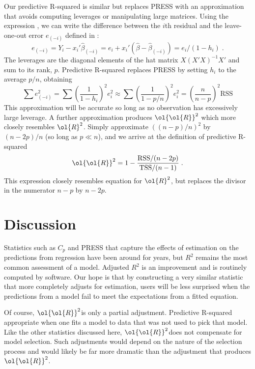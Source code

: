 \documentclass[12pt]{article}
\newcommand{\ars}{\mbox{$\ol{R}^2$}}
\newcommand{\prs}{\mbox{$\ol{\ol{R}}^2$}}
\begin{document}
Our predictive R-squared is similar but replaces PRESS with an approximation that avoids computing leverages or manipulating large matrices.  Using the expression , we can write the difference between the $i$th residual and the leave-one-out error $e_{(-i)}$ defined in :
\begin{equation}
  e_{(-i)} = Y_i - x_i' \hat\beta_{(-i)} = e_i + x_i'(\hat\beta - \hat\beta_{(-i)}) 
              = e_i/(1-h_i) \;.
\end{equation}
The leverages are the diagonal elements of the hat matrix $X(X'X)^{-1}X'$ and sum to its rank, $p$.  Predictive R-squared replaces PRESS by setting $h_i$ to the average $p/n$, obtaining
\begin{equation}
  \sum e_{(-i)}^2 = \sum \left( \frac{1}{1-h_i} \right)^2 e_i^2
               \approx \sum \left( \frac{1}{1-p/n} \right)^2 e_i^2
               = \left(\frac{n}{n-p}\right)^2 \mbox{RSS}
\end{equation}
This approximation will be accurate so long as no observation has excessively large leverage.  A further approximation produces $\prs$ which more closely resembles $\ars$.   Simply approximate $((n-p)/n)^2$ by $(n-2p)/n$ (so long as $p \ll n$), and we arrive at the definition of predictive R-squared
\begin{equation}
  \prs = 1 - \frac{\mbox{RSS}/(n-2p)}
                        {\mbox{TSS}/(n-1) } \; .
\end{equation}
This expression closely resembles equation  for $\ars$, but replaces the divisor in the numerator $n-p$ by $n-2p$.   



\section{Discussion}
\label{sec:disc}

Statistics such as $C_p$ and PRESS that capture the effects of estimation on the predictions from regression have been around for years, but $R^2$ remains the most common assessment of a model.  Adjusted $R^2$ is an improvement and is routinely computed by software.  Our hope is that by constructing a very similar statistic that more completely adjusts for estimation, users will be less surprised when the predictions from a model fail to meet the expectations from a fitted equation.

Of course, \prs is only a partial adjustment.  Predictive R-squared appropriate when one fits a model to data that was not used to pick that model.  Like the other statistics discussed here, \prs  does not compensate for model selection.  Such adjustments would depend on the nature of the selection process and would likely be far more dramatic than the adjustment that produces \prs.




\end{document}
